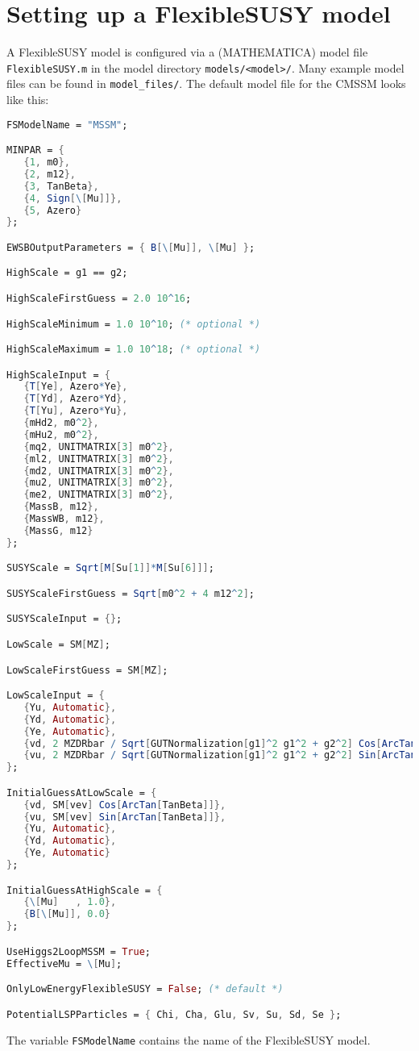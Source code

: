 \documentclass[final,3p,11pt,pdflatex]{elsarticle}
\newcommand{\fs}{FlexibleSUSY\xspace}
\newcommand{\code}[1]{\lstinline|#1|}  %
\begin{document}
\section{Setting up a FlexibleSUSY model}
\label{Sec:modfile}
A \fs model is configured via a (MATHEMATICA) model file
\code{FlexibleSUSY.m} in the model directory \code{models/<model>/}.
Many example model files can be found in \code{model_files/}.  The
default model file for the CMSSM looks like this:
%
\begin{lstlisting}[language=Mathematica]
FSModelName = "MSSM";

MINPAR = {
   {1, m0},
   {2, m12},
   {3, TanBeta},
   {4, Sign[\[Mu]]},
   {5, Azero}
};

EWSBOutputParameters = { B[\[Mu]], \[Mu] };

HighScale = g1 == g2;

HighScaleFirstGuess = 2.0 10^16;

HighScaleMinimum = 1.0 10^10; (* optional *)

HighScaleMaximum = 1.0 10^18; (* optional *)

HighScaleInput = {
   {T[Ye], Azero*Ye},
   {T[Yd], Azero*Yd},
   {T[Yu], Azero*Yu},
   {mHd2, m0^2},
   {mHu2, m0^2},
   {mq2, UNITMATRIX[3] m0^2},
   {ml2, UNITMATRIX[3] m0^2},
   {md2, UNITMATRIX[3] m0^2},
   {mu2, UNITMATRIX[3] m0^2},
   {me2, UNITMATRIX[3] m0^2},
   {MassB, m12},
   {MassWB, m12},
   {MassG, m12}
};

SUSYScale = Sqrt[M[Su[1]]*M[Su[6]]];

SUSYScaleFirstGuess = Sqrt[m0^2 + 4 m12^2];

SUSYScaleInput = {};

LowScale = SM[MZ];

LowScaleFirstGuess = SM[MZ];

LowScaleInput = {
   {Yu, Automatic},
   {Yd, Automatic},
   {Ye, Automatic},
   {vd, 2 MZDRbar / Sqrt[GUTNormalization[g1]^2 g1^2 + g2^2] Cos[ArcTan[TanBeta]]},
   {vu, 2 MZDRbar / Sqrt[GUTNormalization[g1]^2 g1^2 + g2^2] Sin[ArcTan[TanBeta]]}
};

InitialGuessAtLowScale = {
   {vd, SM[vev] Cos[ArcTan[TanBeta]]},
   {vu, SM[vev] Sin[ArcTan[TanBeta]]},
   {Yu, Automatic},
   {Yd, Automatic},
   {Ye, Automatic}
};

InitialGuessAtHighScale = {
   {\[Mu]   , 1.0},
   {B[\[Mu]], 0.0}
};

UseHiggs2LoopMSSM = True;
EffectiveMu = \[Mu];

OnlyLowEnergyFlexibleSUSY = False; (* default *)

PotentialLSPParticles = { Chi, Cha, Glu, Sv, Su, Sd, Se };
\end{lstlisting}
%
The variable \code{FSModelName} contains the name of the \fs model.
\end{document}
